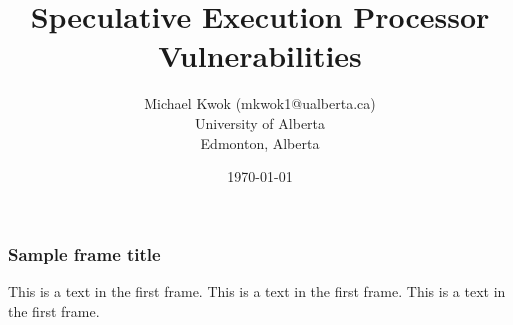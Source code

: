 \documentclass{beamer}
\title{Speculative Execution Processor Vulnerabilities}
\author{Michael Kwok (mkwok1@ualberta.ca) \\ University of Alberta \\ Edmonton, Alberta}
\institute{University of Alberta}
\date{\today}
\begin{document}
 
\frame{\titlepage}
 
\begin{frame}
\frametitle{Sample frame title}
This is a text in the first frame. This is a text in the first frame. This is a text in the first frame.
\end{frame}
 
\end{document}
